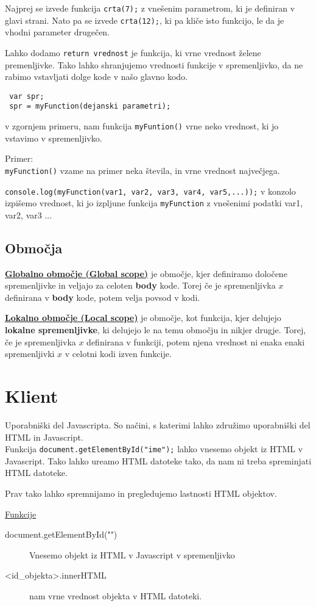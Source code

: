Najprej se izvede funkcija \texttt{crta(7);} z vnešenim parametrom, ki je definiran v glavi strani. Nato pa se izvede \texttt{crta(12);}, ki pa kliče isto funkcijo, le da je vhodni parameter drugečen.

Lahko dodamo  \texttt{return vrednost} je funkcija, ki vrne vrednost želene premenljivke.
Tako lahko shranjujemo vrednosti funkcije v spremenljivko, da ne rabimo vstavljati dolge kode v našo glavno kodo.

\pagebreak

\begin{verbatim}
 var spr;
 spr = myFunction(dejanski parametri);
\end{verbatim}
v zgornjem primeru, nam funkcija \texttt{myFuntion()} vrne neko vrednost, ki jo vstavimo v spremenljivko.

Primer:\\
\texttt{myFunction()} vzame na primer neka števila, in vrne vrednost največjega.

\texttt{console.log(myFunction(var1, var2, var3, var4, var5,...));} v konzolo izpišemo vrednost, ki jo izpljune funkcija \texttt{myFunction} z vnešenimi podatki var1, var2, var3 ...

\subsection*{Območja}

\underline{\textbf{Globalno območje (Global scope)}} je območje, kjer definiramo določene spremenljivke in veljajo za celoten \textbf{body} kode. Torej če je spremenljivka $x$ definirana v \textbf{body} kode, potem velja povsod v kodi.

\textbf{\underline{Lokalno območje (Local scope)}} je območje, kot funkcija, kjer delujejo \textbf{lokalne spremenljivke}, ki delujejo le na temu območju in nikjer drugje. Torej, če je spremenljivka $x$ definirana v funkciji, potem njena vrednost ni enaka enaki spremenljivki $x$ v celotni kodi izven funkcije.

\section{Klient}

Uporabniški del Javascripta. So načini, s katerimi lahko združimo uporabniški del HTML in Javascript.\\

Funkcija \texttt{document.getElementById("ime");} lahko vnesemo objekt iz HTML v Javascript. Tako lahko ureamo HTML datoteke tako, da nam ni treba spreminjati HTML datoteke.

Prav tako lahko spremnijamo in pregledujemo lastnosti HTML objektov.

\underline{Funkcije}
\begin{description}
	\item[document.getElementById("")] Vnesemo objekt iz HTML v Javascript v spremenljivko
	\item[<id\_objekta>.innerHTML] nam vrne vrednost objekta v HTML datoteki. 
\end{description}